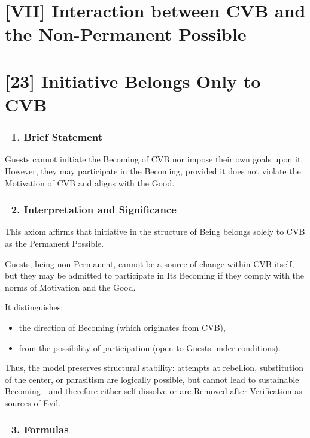 \documentclass[12pt]{article}
\begin{document}
\section*{[VII] Interaction between CVB and the Non-Permanent Possible}

\section*{[23] Initiative Belongs Only to CVB}

\subsubsection*{🔹 1. Brief Statement}

Guests cannot initiate the Becoming of CVB nor impose their own goals upon it. However, they may participate in the Becoming, provided it does not violate the Motivation of CVB and aligns with the Good.

\subsubsection*{🔹 2. Interpretation and Significance}

This axiom affirms that initiative in the structure of Being belongs solely to CVB as the Permanent Possible.

Guests, being non-Permanent, cannot be a source of change within CVB itself, but they may be admitted to participate in Its Becoming if they comply with the norms of Motivation and the Good.

It distinguishes:

\begin{itemize}
\item the direction of Becoming (which originates from CVB),
\item from the possibility of participation (open to Guests under conditions).
\end{itemize}

Thus, the model preserves structural stability: attempts at rebellion, substitution of the center, or parasitism are logically possible, but cannot lead to sustainable Becoming—and therefore either self-dissolve or are Removed after Verification as sources of Evil.

\subsubsection*{🔹 3. Formulas}
\end{document}
